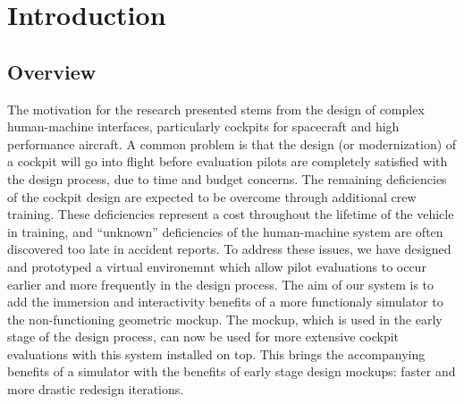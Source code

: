 \chapter{Introduction}

\section{Overview}
\label{overview}

The motivation for the research presented stems from the design of complex human-machine interfaces, particularly cockpits for spacecraft and high performance aircraft.
A common problem is that the design (or modernization) of a cockpit will go into flight before evaluation pilots are completely satisfied with the design process, due to time and budget concerns.
The remaining deficiencies of the cockpit design are expected to be overcome through additional crew training.
These deficiencies represent a cost throughout the lifetime of the vehicle in training, and ``unknown'' deficiencies of the human-machine system are often discovered too late in accident reports.
To address these issues, we have designed and prototyped a virtual environemnt which allow pilot evaluations to occur earlier and more frequently in the design process.
The aim of our system is to add the immersion and interactivity benefits of a more functionaly simulator to the non-functioning geometric mockup.
The mockup, which is used in the early stage of the design process, can now be used for more extensive cockpit evaluations with this system installed on top.
This brings the accompanying benefits of a simulator with the benefits of early stage design mockups: faster and more drastic redesign iterations.



